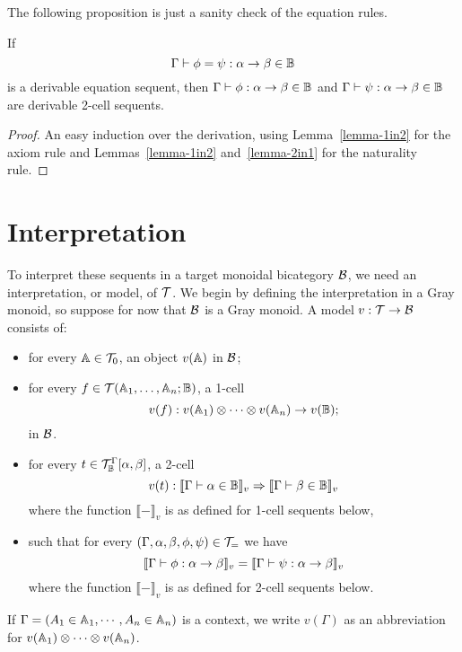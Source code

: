 \documentclass{robinthesisdraft}
\begin{document}
The following proposition is just a sanity check of the equation rules.
\begin{propn}
	If \[\Gamma\vdash\phi=\psi: \alpha\to\beta\in\mathbb{B}\] is a derivable equation
	sequent, then $\Gamma\vdash\phi: \alpha\to\beta\in\mathbb{B}$
	and $\Gamma\vdash\psi: \alpha\to\beta\in\mathbb{B}$
	are derivable 2-cell sequents.
\end{propn}
\begin{proof}
	An easy induction over the derivation, using
	Lemma~\ref{lemma-1in2} for the axiom rule and
	Lemmas~\ref{lemma-1in2} and~\ref{lemma-2in1} for the naturality rule.
\end{proof}

\section{Interpretation}
To interpret these sequents in a target monoidal bicategory $\mathcal{B}$, we need
an interpretation, or model, of ${\mathcal{T}}$. We begin by defining the interpretation
in a Gray monoid, so suppose for now that $\mathcal{B}$ is a Gray monoid.
A model $v:{\mathcal{T}}\to\mathcal{B}$ consists of:
\begin{itemize}
	\item for every $\mathbb{A}\in{\mathcal{T}}_{0}$, an object $v(\mathbb{A})$ in $\mathcal{B}$;
	\item for every $f\in{\mathcal{T}}(\mathbb{A}_{1},\dots,\mathbb{A}_{n};\mathbb{B})$, a 1-cell
	\[
		v(f): v(\A_{1})\tn\cdots\tn v(\A_{n})\to v(\CB);
	\]
	in $\mathcal{B}$.
	\item for every $t\in{\mathcal{T}}^{\Gamma}_{\mathbb{B}}[\alpha, \beta]$, a 2-cell
	\[
		v(t): \llbracket \Gamma\vdash\alpha\in\mathbb{B} \rrbracket_{v} \Rightarrow
			\llbracket \Gamma\vdash\beta\in\mathbb{B} \rrbracket_{v}
	\]
	where the function $\llbracket-\rrbracket_{v}$ is as defined for 1-cell
	sequents below,
	\item such that for every $(\Gamma,\alpha,\beta,\phi,\psi)\in{\mathcal{T}}_{=}$
	we have
	\[
		\llbracket \Gamma\vdash\phi:\alpha\to\beta \rrbracket_{v}
		=
		\llbracket \Gamma\vdash\psi:\alpha\to\beta \rrbracket_{v}
	\]
	where the function $\llbracket-\rrbracket_{v}$ is as defined for 2-cell
	sequents below.
\end{itemize}
If $\Gamma = (A_{1}\in\mathbb{A}_{1}, \cdots, A_{n}\in\mathbb{A}_{n})$ is a context, we write
$v(\Gamma)$ as an abbreviation for $v(\A_{1})\tn\cdots\tn v(\A_{n})$.
%
\end{document}
